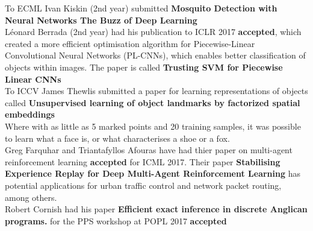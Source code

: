 \documentclass[10pt,final]{papertex}
\begin{document}
\begin{news}{1}
 To ECML Ivan Kiskin (2nd year) submitted \textbf{Mosquito Detection with Neural Networks The Buzz of Deep Learning}\\
 
 
L\'eonard Berrada (2nd year) had his publication to ICLR 2017 \textbf{accepted}, which created a more efficient optimisation algorithm for  Piecewise-Linear Convolutional Neural Networks (PL-CNNs), which enables better classification of objects within images. The paper is called \textbf{Trusting SVM for Piecewise Linear CNNs}\\

To ICCV James Thewlis submitted a paper for learning representations of objects called \textbf{Unsupervised learning of object landmarks by factorized spatial embeddings}\\
Where with as little as 5 marked points and 20 training samples, it was possible to learn what a face is, or what characterises a shoe or a fox.\\

Greg Farquhar and Triantafyllos Afouras have had thier paper on multi-agent reinforcement learning \textbf{accepted} for ICML 2017. Their paper \textbf{Stabilising Experience Replay for Deep Multi-Agent Reinforcement Learning} has potential applications for urban traffic control and network packet routing, among others. \\

Robert Cornish had his paper \textbf{Efficient exact inference in discrete Anglican programs.} for the PPS workshop at POPL 2017 \textbf{accepted}  \end{news}

\newssep

\end{document}
